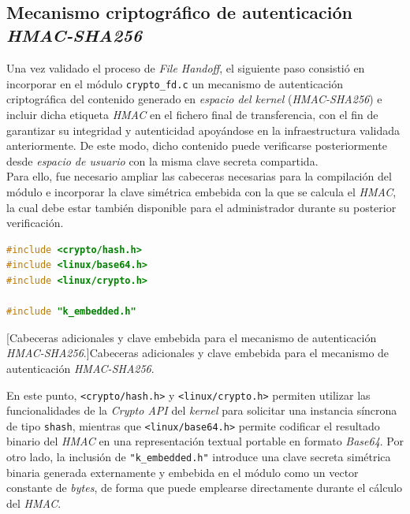 \

\subsection{Mecanismo criptográfico de autenticación \textit{HMAC-SHA256}}
\label{sec:proto-crypto}

Una vez validado el proceso de \textit{File Handoff}, el siguiente paso consistió en incorporar en el módulo \verb|crypto_fd.c| un mecanismo de autenticación criptográfica del contenido generado en \textit{espacio del kernel} (\textit{HMAC-SHA256}) e incluir dicha etiqueta \textit{HMAC} en el fichero final de transferencia, con el fin de garantizar su integridad y autenticidad apoyándose en la infraestructura validada anteriormente.
De este modo, dicho contenido puede verificarse posteriormente desde \textit{espacio de usuario} con la misma clave secreta compartida.\\

Para ello, fue necesario ampliar las cabeceras necesarias para la compilación del módulo e incorporar la clave simétrica embebida con la que se calcula el \textit{HMAC}, la cual debe estar también disponible para el administrador durante su posterior verificación.\\

\begin{lstlisting}[language=C]
#include <crypto/hash.h>
#include <linux/base64.h>
#include <linux/crypto.h>

#include "k_embedded.h"
\end{lstlisting}
\captionsetup{type=code,justification=centering,singlelinecheck=false}
[Cabeceras adicionales y clave embebida para el mecanismo de autenticación \textit{HMAC-SHA256}.]{Cabeceras adicionales y clave embebida para el mecanismo de autenticación \textit{HMAC-SHA256}.}
\label{cod:crypto_headers}
\vspace{\baselineskip}

En este punto, \verb|<crypto/hash.h>| y \verb|<linux/crypto.h>| permiten utilizar las funcionalidades de la \textit{Crypto API} del \textit{kernel} para solicitar una instancia síncrona de tipo \verb|shash|, mientras que \verb|<linux/base64.h>| permite codificar el resultado binario del \textit{HMAC} en una representación textual portable en formato \textit{Base64}.
Por otro lado, la inclusión de \verb|"k_embedded.h"| introduce una clave secreta simétrica binaria generada externamente y embebida en el módulo como un vector constante de \textit{bytes}, de forma que puede emplearse directamente durante el cálculo del \textit{HMAC}.\\

